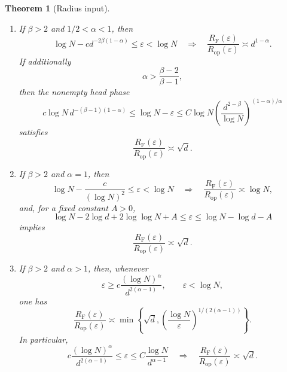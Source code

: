 \documentclass[11pt]{article}
\newtheorem{theorem}{Theorem}[section]
\newcommand{\eps}{\varepsilon}
\newcommand{\RF}{R_{\mathrm F}}
\newcommand{\Rop}{R_{\mathrm{op}}}
\begin{document}
\begin{theorem}[Radius input]
\begin{enumerate}[label=\textup{(\roman*)},leftmargin=2.2em]
\item If $\beta>2$ and $1/2<\alpha<1$, then
\begin{equation}
 \log N-cd^{-2\beta(1-\alpha)}\leq\eps<\log N
 \quad\Longrightarrow\quad
 \frac{\RF(\eps)}{\Rop(\eps)}\asymp d^{1-\alpha}.
 \label{eq:radius-local-between}
\end{equation}
If additionally
\begin{equation}
 \alpha>\frac{\beta-2}{\beta-1},
 \label{eq:head-condition}
\end{equation}
then the nonempty head phase
\begin{equation}
 c\log N\,d^{-(\beta-1)(1-\alpha)}
 \leq
 \log N-\eps
 \leq
 C\log N
 \left(\frac{d^{2-\beta}}{\log N}\right)^{(1-\alpha)/\alpha}
 \label{eq:radius-head-between-window}
\end{equation}
satisfies
\begin{equation}
 \frac{\RF(\eps)}{\Rop(\eps)}\asymp\sqrt d.
 \label{eq:radius-head-between-ratio}
\end{equation}

\item If $\beta>2$ and $\alpha=1$, then
\begin{equation}
 \log N-\frac{c}{(\log N)^2}\leq\eps<\log N
 \quad\Longrightarrow\quad
 \frac{\RF(\eps)}{\Rop(\eps)}\asymp\log N,
 \label{eq:radius-alpha-one-local}
\end{equation}
and, for a fixed constant $A>0$,
\begin{equation}
 \log N-2\log d+2\log\log N+A
 \leq\eps\leq
 \log N-\log d-A
 \label{eq:radius-alpha-one-head-window}
\end{equation}
implies
\begin{equation}
 \frac{\RF(\eps)}{\Rop(\eps)}\asymp\sqrt d.
 \label{eq:radius-alpha-one-head-ratio}
\end{equation}

\item If $\beta>2$ and $\alpha>1$, then, whenever
\begin{equation}
 \eps\geq c\frac{(\log N)^\alpha}{d^{2(\alpha-1)}},
 \qquad
 \eps<\log N,
 \label{eq:radius-above-one-full-window}
\end{equation}
one has
\begin{equation}
 \frac{\RF(\eps)}{\Rop(\eps)}
 \asymp
 \min\left\{\sqrt d,
 \left(\frac{\log N}{\eps}\right)^{1/(2(\alpha-1))}
 \right\}.
 \label{eq:radius-above-one-full}
\end{equation}
In particular,
\begin{equation}
 c\frac{(\log N)^\alpha}{d^{2(\alpha-1)}}
 \leq\eps\leq
 C\frac{\log N}{d^{\alpha-1}}
 \quad\Longrightarrow\quad
 \frac{\RF(\eps)}{\Rop(\eps)}\asymp\sqrt d.
 \label{eq:radius-above-one-square-root}
\end{equation}
\end{enumerate}
\end{theorem}
\end{document}
